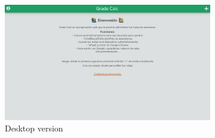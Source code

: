 \vfill
\begin{figure}[ht!]
    \begin{subfigure}[b]{0.757\textwidth-0.1cm}
        \centering
        \includegraphics[width=\textwidth]{media/screenshots/screenshot-tutorial-pc.png}
        \caption{Desktop version}
    \end{subfigure}
    \hfill
    \begin{subfigure}[b]{0.243\textwidth-0.1cm}
        \centering

\end{subfigure}
\end{figure}
